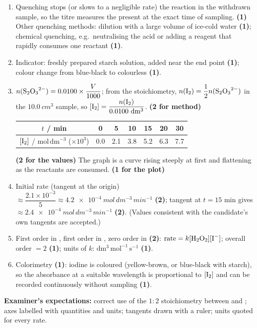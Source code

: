 \documentclass[11pt]{article}
\begin{document}
\begin{corrige}
\begin{enumerate}
\item Quenching stops (or slows to a negligible rate) the reaction in the withdrawn sample, so the titre measures the  present at the exact time of sampling. \textbf{(1)} Other quenching methods: dilution with a large volume of ice-cold water \textbf{(1)}; chemical quenching, e.g.\ neutralising the acid or adding a reagent that rapidly consumes one reactant \textbf{(1)}.
\item Indicator: freshly prepared starch solution, added near the end point \textbf{(1)}; colour change from blue-black to colourless \textbf{(1)}.
\item $n(\ce{S2O3^{2-}}) = 0.0100 \times \dfrac{V}{1000}$; from the stoichiometry, $n(\ce{I2}) = \dfrac{1}{2}n(\ce{S2O3^{2-}})$ in the $\SI{10.0}{cm^{3}}$ sample, so $[\ce{I2}] = \dfrac{n(\ce{I2})}{0.0100\ \mathrm{dm^{3}}}$. \textbf{(2 for method)}
\begin{center}
\begin{tabular}{|c|c|c|c|c|c|c|}
\hline
\rowcolor{popblueL} $t$ / min & 0 & 5 & 10 & 15 & 20 & 30 \\
\hline $[\ce{I2}]$ / $\mathrm{mol\,dm^{-3}}$ ($\times 10^{3}$) & 0.0 & 2.1 & 3.8 & 5.2 & 6.3 & 7.7 \\
\hline
\end{tabular}
\end{center}
\textbf{(2 for the values)} The graph is a curve rising steeply at first and flattening as the reactants are consumed. \textbf{(1 for the plot)}
\item Initial rate (tangent at the origin) $\approx \dfrac{2.1\times 10^{-3}}{5} \approx \SI{4.2e-4}{mol\,dm^{-3}\,min^{-1}}$ \textbf{(2)}; tangent at $t = 15$ min gives $\approx \SI{2.4e-4}{mol\,dm^{-3}\,min^{-1}}$ \textbf{(2)}. (Values consistent with the candidate's own tangents are accepted.)
\item First order in , first order in , zero order in  \textbf{(2)}: $\text{rate} = k[\ce{H2O2}][\ce{I-}]$; overall order $= 2$ \textbf{(1)}; units of $k$: $\mathrm{dm^{3}\,mol^{-1}\,s^{-1}}$ \textbf{(1)}.
\item Colorimetry \textbf{(1)}: iodine is coloured (yellow-brown, or blue-black with starch), so the absorbance at a suitable wavelength is proportional to $[\ce{I2}]$ and can be recorded continuously without sampling \textbf{(1)}.
\end{enumerate}
\textbf{Examiner's expectations:} correct use of the $1:2$ stoichiometry between  and ; axes labelled with quantities and units; tangents drawn with a ruler; units quoted for every rate.
\end{corrige}
\end{document}
